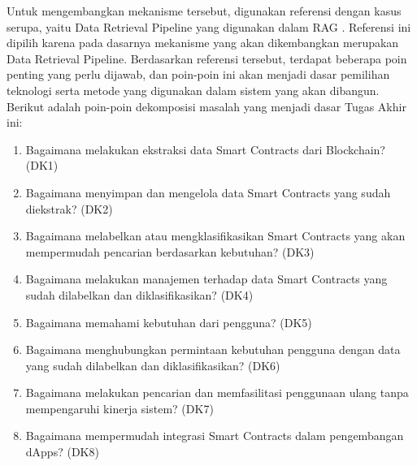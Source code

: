 
Untuk mengembangkan mekanisme tersebut, digunakan referensi dengan kasus serupa, yaitu Data Retrieval Pipeline yang digunakan dalam RAG \parencite{CrateDB_RAG_Pipelines}. Referensi ini dipilih karena pada dasarnya mekanisme yang akan dikembangkan merupakan Data Retrieval Pipeline. Berdasarkan referensi tersebut, terdapat beberapa poin penting yang perlu dijawab, dan poin-poin ini akan menjadi dasar pemilihan teknologi serta metode yang digunakan dalam sistem yang akan dibangun. Berikut adalah poin-poin dekomposisi masalah yang menjadi dasar Tugas Akhir ini:

\begin{enumerate}
	\item Bagaimana melakukan ekstraksi data Smart Contracts dari Blockchain? (DK1)
	\item Bagaimana menyimpan dan mengelola data Smart Contracts yang sudah diekstrak? (DK2)
	\item Bagaimana melabelkan atau mengklasifikasikan Smart Contracts yang akan mempermudah pencarian berdasarkan kebutuhan? (DK3)
	\item Bagaimana melakukan manajemen terhadap data Smart Contracts yang sudah dilabelkan dan diklasifikasikan? (DK4)
	\item Bagaimana memahami kebutuhan dari pengguna? (DK5)
	\item Bagaimana menghubungkan permintaan kebutuhan pengguna dengan data yang sudah dilabelkan dan diklasifikasikan? (DK6)
	\item Bagaimana melakukan pencarian dan memfasilitasi penggunaan ulang tanpa mempengaruhi kinerja sistem? (DK7)
	\item Bagaimana mempermudah integrasi Smart Contracts dalam pengembangan dApps? (DK8)
\end{enumerate}

